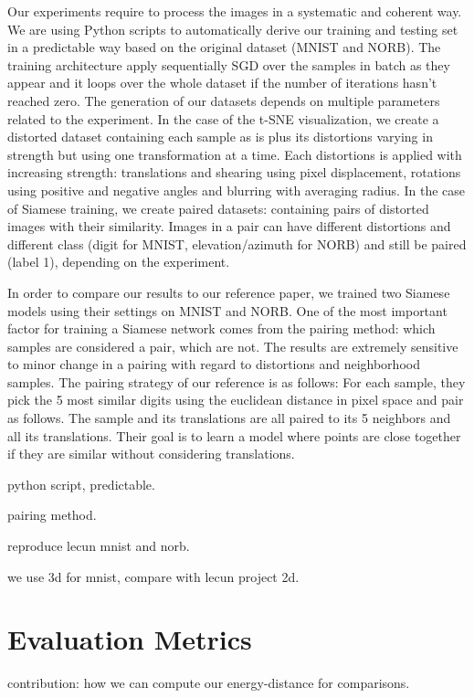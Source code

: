 \documentclass[a4paper,12pt]{report}
\begin{document}
Our experiments require to process the images in a systematic and coherent way.
We are using Python scripts to automatically derive our training and testing set in a predictable way based on the original dataset (MNIST and NORB).
The training architecture apply sequentially SGD over the samples in batch as they appear and it loops over the whole dataset if the number of iterations hasn't reached zero.
The generation of our datasets depends on multiple parameters related to the experiment.
In the case of the t-SNE visualization, we create a distorted dataset containing each sample as is plus its distortions varying in strength but using one transformation at a time.
Each distortions is applied with increasing strength: translations and shearing using pixel displacement, rotations using positive and negative angles and blurring with averaging radius.
In the case of Siamese training, we create paired datasets: containing pairs of distorted images with their similarity.
Images in a pair can have different distortions and different class (digit for MNIST, elevation/azimuth for NORB) and still be paired (label 1), depending on the experiment.


In order to compare our results to our reference paper, we trained two Siamese models using their settings on MNIST and NORB.
One of the most important factor for training a Siamese network comes from the pairing method: which samples are considered a pair, which are not.
The results are extremely sensitive to minor change in a pairing with regard to distortions and neighborhood samples.
The pairing strategy of our reference is as follows: For each sample, they pick the 5 most similar digits using the euclidean distance in pixel space and pair as follows.
The sample and its translations are all paired to its 5 neighbors and all its translations.
Their goal is to learn a model where points are close together if they are similar without considering translations.


python script, predictable.

pairing method.

reproduce lecun mnist and norb.

we use 3d for mnist, compare with lecun project 2d.

\section{Evaluation Metrics}
contribution: how we can compute our energy-distance for comparisons.
\end{document}
